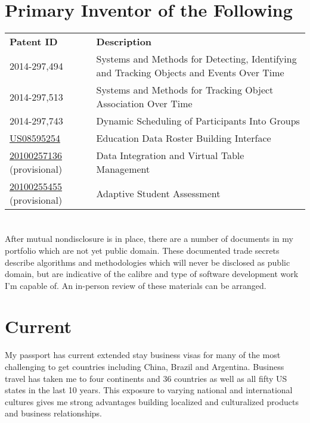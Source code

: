 \section{Primary Inventor of the Following }
\begin{tabular}{p{4.5cm} p{11.5cm}}
\textbf{Patent ID} & \textbf{Description}\\
2014-297,494 & Systems and Methods for Detecting, Identifying and Tracking Objects and Events Over Time \\
2014-297,513 & Systems and Methods for Tracking Object Association Over Time \\
2014-297,743 & Dynamic Scheduling of Participants Into Groups \\
\href{http://www.uspto.gov/web/patents/patog/week48/OG/html/1396-4/US08595254-20131126.html}{US08595254} & Education Data Roster Building Interface \\
\href{http://patents.justia.com/patent/20100257136}{20100257136} (provisional) & Data Integration and Virtual Table Management \\
\href{http://patents.justia.com/patent/20100255455}{20100255455} (provisional) & Adaptive Student Assessment \\
\end{tabular}

\bigskip
\bigskip

\section{}
After mutual nondisclosure is in place, there are a number of documents in my portfolio which are not yet public domain.  These documented trade secrets describe algorithms and methodologies which will never be disclosed as public domain, but are indicative of the calibre and type of software development work I'm capable of.  An in-person review of these materials can be arranged.

\section{Current }
My passport has current extended stay business visas for many of the most challenging to get countries including China, Brazil and Argentina.  Business travel has taken me to four continents and 36 countries as well as all fifty US states in the last 10 years.  This exposure to varying national and international cultures gives me strong advantages building localized and culturalized products and business relationships.